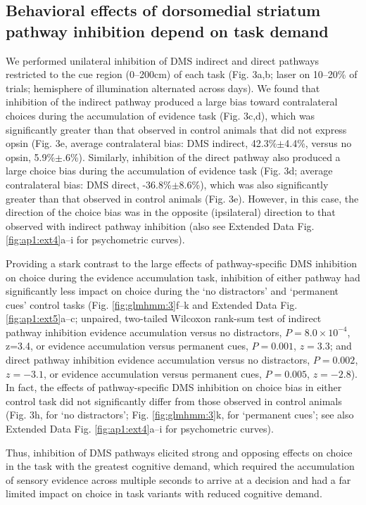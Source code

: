 \subsection{Behavioral effects of dorsomedial striatum pathway inhibition depend on task demand}
\label{sec:glmhmm:2.2.4}
We performed unilateral inhibition of DMS indirect and direct pathways restricted to the cue region (0–200cm) of each task (Fig. 3a,b; laser on 10–20\% of trials; hemisphere of illumination alternated across days). We found that inhibition of the indirect pathway produced a large bias toward contralateral choices during the accumulation of evidence task (Fig. 3c,d), which was significantly greater than that observed in control animals that did not express opsin (Fig. 3e, average contralateral bias: DMS indirect, 42.3\%$\pm$4.4\%, versus no opsin, 5.9\%$\pm$.6\%). Similarly, inhibition of the direct pathway also produced a large choice bias during the accumulation of evidence task (Fig. 3d; average contralateral bias: DMS direct, -36.8\%$\pm$8.6\%), which was also significantly greater than that observed in control animals (Fig. 3e). However, in this case, the direction of the choice bias was in the opposite (ipsilateral) direction to that observed with indirect pathway inhibition (also see Extended Data Fig. \ref{fig:ap1:ext4}a–i for psychometric curves).

Providing a stark contrast to the large effects of pathway-specific DMS inhibition on choice during the evidence accumulation task, inhibition of either pathway had significantly less impact on choice during the ‘no distractors’ and ‘permanent cues’ control tasks (Fig. \ref{fig:glmhmm:3}f–k and Extended Data Fig. \ref{fig:ap1:ext5}a–c; unpaired, two-tailed Wilcoxon rank-sum test of indirect pathway inhibition evidence accumulation versus no distractors, $P=8.0 \times 10^{-4}$, z=3.4, or evidence accumulation versus permanent cues, $P=0.001$, $z=3.3$; and direct pathway inhibition evidence accumulation versus no distractors, $P=0.002$, $z=-3.1$, or evidence accumulation versus permanent cues, $P=0.005$, $z=-2.8$). In fact, the effects of pathway-specific DMS inhibition on choice bias in either control task did not significantly differ from those observed in control animals (Fig. 3h, for ‘no distractors’; Fig. \ref{fig:glmhmm:3}k, for ‘permanent cues’; see also Extended Data Fig. \ref{fig:ap1:ext4}a–i for psychometric curves).

Thus, inhibition of DMS pathways elicited strong and opposing effects on choice in the task with the greatest cognitive demand, which required the accumulation of sensory evidence across multiple seconds to arrive at a decision and had a far limited impact on choice in task variants with reduced cognitive demand.

